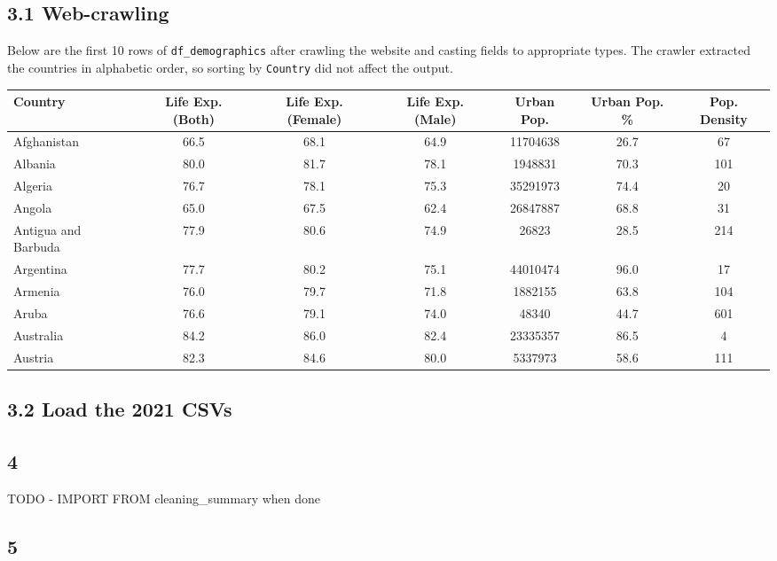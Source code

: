 \documentclass[14pt]{extarticle}
\begin{document}
\subsection*{3.1 Web-crawling}
Below are the first 10 rows of \texttt{df\_demographics} after crawling the website
and casting fields to appropriate types. The crawler extracted the countries in alphabetic order,
so sorting by \texttt{Country} did not affect the output.

{\scriptsize
\begin{center}
\begin{tabular}{ |l|c|c|c|c|c|c| }
  \hline
  Country&Life Exp. (Both)&Life Exp. (Female)&Life Exp. (Male)&Urban Pop.&Urban Pop. \%&Pop. Density\\
  \hline
  Afghanistan&66.5&68.1&64.9&11704638&26.7&67\\
  Albania&80.0&81.7&78.1&1948831&70.3&101\\
  Algeria&76.7&78.1&75.3&35291973&74.4&20\\
  Angola&65.0&67.5&62.4&26847887&68.8&31\\
  Antigua and Barbuda&77.9&80.6&74.9&26823&28.5&214\\
  Argentina&77.7&80.2&75.1&44010474&96.0&17\\
  Armenia&76.0&79.7&71.8&1882155&63.8&104\\
  Aruba&76.6&79.1&74.0&48340&44.7&601\\
  Australia&84.2&86.0&82.4&23335357&86.5&4\\
  Austria&82.3&84.6&80.0&5337973&58.6&111\\
  \hline
\end{tabular}
\end{center}}

\subsection*{3.2 Load the 2021 CSVs}
\subsection*{4}
TODO - IMPORT FROM cleaning\_summary when done
\subsection*{5}
\end{document}
